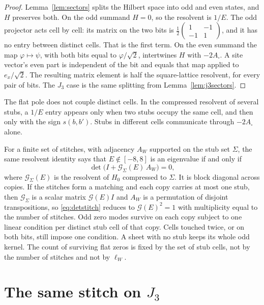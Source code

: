 \begin{proof}
Lemma~\ref{lem:sectors} splits the Hilbert space into odd and even states,
and \(H\) preserves both. On the odd summand \(H=0\), so the resolvent is
\(1/E\). The odd projector acts cell by cell: its matrix on the two bits is
\(\tfrac12\begin{pmatrix}1&-1\\-1&1\end{pmatrix}\), and it has no entry
between distinct cells. That is the first term.
On the even summand the map \(\varphi\mapsto\psi\), with both bits equal to
\(\varphi/\sqrt{2}\), intertwines \(H\) with \(-2A_\square\).
A site vector's even part is independent of the bit and equals that map
applied to \(e_x/\sqrt{2}\). The resulting matrix element is half the
square-lattice resolvent, for every pair of bits.
The \(J_3\) case is the same splitting from Lemma~\ref{lem:j3sectors}.
\end{proof}

The flat pole does not couple distinct cells. In the compressed resolvent
of several stubs, a \(1/E\) entry appears only when two stubs occupy the
same cell, and then only with the sign \(s(b,b')\). Stubs in different
cells communicate through \(-2A_\square\) alone.

For a finite set of stitches, with adjacency \(A_W\) supported on the stub
set \(\Sigma\), the same resolvent identity says that
\(E\notin[-8,8]\) is an eigenvalue if and only if
\begin{equation}
\label{eq:detstitch}
\det\bigl(I+\mathcal{G}_\Sigma(E)\,A_W\bigr)=0,
\end{equation}
where \(\mathcal{G}_\Sigma(E)\) is the resolvent of \(H_0\) compressed to \(\Sigma\).
It is block diagonal across copies.
If the stitches form a matching and each copy carries at most one stub,
then \(\mathcal{G}_\Sigma\) is a scalar matrix \(\mathcal{G}(E)I\) and \(A_W\) is a permutation of
disjoint transpositions, so \eqref{eq:detstitch} reduces to \(\mathcal{G}(E)^2=1\)
with multiplicity equal to the number of stitches.
Odd zero modes survive on each copy subject to one linear condition per
distinct stub cell of that copy.
Cells touched twice, or on both bits, still impose one condition.
A sheet with no stub keeps its whole odd kernel.
The count of surviving flat zeros is fixed by the set of stub cells, not
by the number of stitches and not by \(\ell_W\).

\section{The same stitch on \texorpdfstring{\(J_3\)}{J3}}
\label{sec:stitch3}


